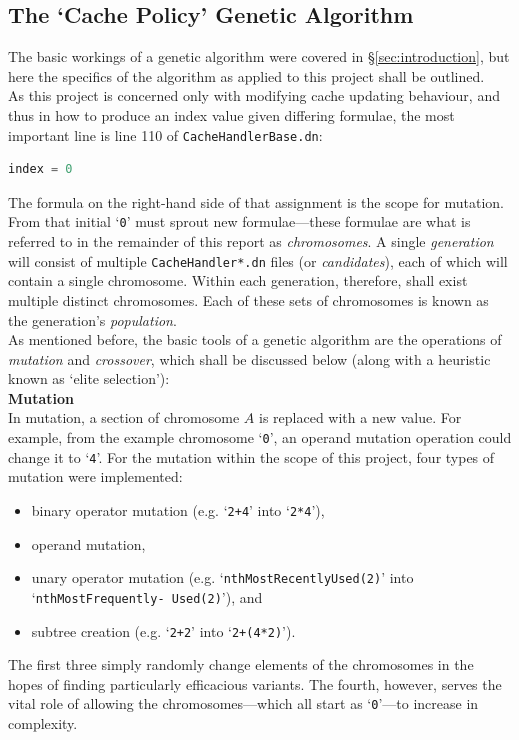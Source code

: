 \documentclass[compsoc,12pt,a4paper]{IEEEtran}
\begin{document}
		\subsection{The `Cache Policy' Genetic Algorithm}
		
			The basic workings of a genetic algorithm were covered in \S \ref{sec:introduction}, but here the specifics of the algorithm as applied to this project shall be outlined.\\
			As this project is concerned only with modifying cache updating behaviour, and thus in how to produce an index value given differing formulae, the most important line is line 110 of \lstinline|CacheHandlerBase.dn|:
			\begin{lstlisting}[language=Java]
				index = 0
			\end{lstlisting}
			The formula on the right-hand side of that assignment is the scope for mutation. From that initial `\lstinline|0|' must sprout new formulae---these formulae are what is referred to in the remainder of this report as \textit{chromosomes}. A single \textit{generation} will consist of multiple \lstinline|CacheHandler*.dn| files (or \textit{candidates}), each of which will contain a single chromosome. Within each generation, therefore, shall exist multiple distinct chromosomes. Each of these sets of chromosomes is known as the generation's \textit{population}.\\
			As mentioned before, the basic tools of a genetic algorithm are the operations of \textit{mutation} and \textit{crossover}, which shall be discussed below (along with a heuristic known as `elite selection'):\\
			
			\noindent\textbf{Mutation}\\
			
			\noindent In mutation, a section of chromosome $A$ is replaced with a new value. For example, from the example chromosome `\lstinline|0|', an operand mutation operation could change it to `\lstinline|4|'. For the mutation within the scope of this project, four types of mutation were implemented:
				\begin{itemize}
					\item binary operator mutation (e.g. `\lstinline|2+4|' into `\lstinline|2*4|'),
					\item operand mutation,
					\item unary operator mutation (e.g. `\lstinline|nthMostRecentlyUsed(2)|' into `\lstinline|nthMostFrequently- Used(2)|'), and
					\item subtree creation (e.g. `\lstinline|2+2|' into `\lstinline|2+(4*2)|').
				\end{itemize}
				The first three simply randomly change elements of the chromosomes in the hopes of finding particularly efficacious variants. The fourth, however, serves the vital role of allowing the chromosomes---which all start as `\lstinline|0|'---to increase in complexity.\\
				
\end{document}
